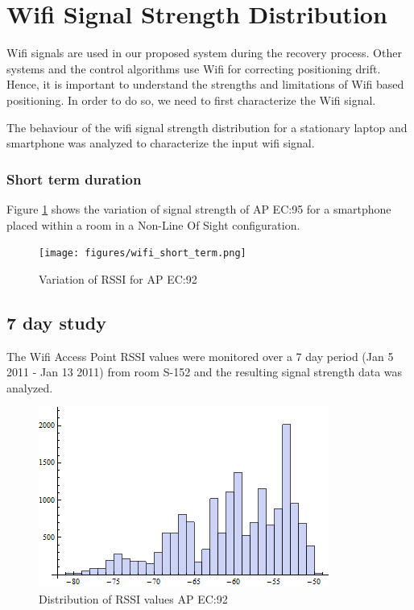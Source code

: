 \section{Wifi Signal Strength Distribution}

Wifi signals are used in our proposed system during the recovery process.
Other systems and the control algorithms use Wifi for correcting positioning
drift. Hence, it is important to understand the strengths and limitations of 
Wifi based positioning. In order to do so, we need to first characterize
the Wifi signal.

The behaviour of the wifi signal strength distribution for a stationary laptop 
and smartphone was analyzed to characterize the input wifi signal.

\subsubsection{Short term duration}

Figure \ref{fig:closestAPshortterm} shows the variation of signal strength of 
AP EC:95 for a smartphone placed within a room in a 
Non-Line Of Sight configuration.

\begin{figure}\centering
    \texttt{[image: figures/wifi\_short\_term.png]}
    \caption{Variation of RSSI for AP EC:92 \label{fig:closestAPshortterm}}
\end{figure}

\subsection{7 day study}

The Wifi Access Point RSSI values were monitored over a 7 day period 
(Jan 5 2011 - Jan 13 2011) from room S-152 and the resulting signal strength 
data was analyzed.


\begin{figure}\centering
    \includegraphics{figures/histogram_00_1C_F0_CB_EC_92.png}
    \caption{Distribution of RSSI values AP EC:92\label{fig:histogram_00_1C_F0_CB_EC_92}}
\end{figure}

